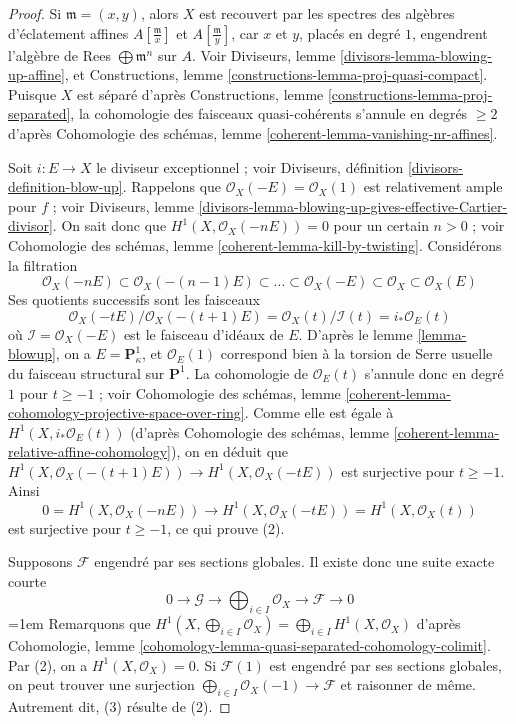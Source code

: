 \begin{proof} Si $\mathfrak m = (x, y)$, alors $X$ est recouvert par les spectres des algèbres d'éclatement affines $A[\frac{\mathfrak m}{x}]$ et $A[\frac{\mathfrak m}{y}]$, car $x$ et $y$, placés en degré $1$, engendrent l'algèbre de Rees $\bigoplus \mathfrak m^n$ sur $A$. Voir Diviseurs, lemme \ref{divisors-lemma-blowing-up-affine}, et Constructions, lemme \ref{constructions-lemma-proj-quasi-compact}. Puisque $X$ est séparé d'après Constructions, lemme \ref{constructions-lemma-proj-separated}, la cohomologie des faisceaux quasi-cohérents s'annule en degrés $\geq 2$ d'après Cohomologie des schémas, lemme \ref{coherent-lemma-vanishing-nr-affines}.

\medskip\noindent Soit $i : E \to X$ le diviseur exceptionnel ; voir Diviseurs, définition \ref{divisors-definition-blow-up}. Rappelons que $\mathcal{O}_X(-E) = \mathcal{O}_X(1)$ est relativement ample pour $f$ ; voir Diviseurs, lemme \ref{divisors-lemma-blowing-up-gives-effective-Cartier-divisor}. On sait donc que $H^1(X, \mathcal{O}_X(-nE)) = 0$ pour un certain $n > 0$ ; voir Cohomologie des schémas, lemme \ref{coherent-lemma-kill-by-twisting}. Considérons la filtration $$
\mathcal{O}_X(-nE) \subset \mathcal{O}_X(-(n - 1)E) \subset
\ldots \subset \mathcal{O}_X(-E) \subset \mathcal{O}_X \subset \mathcal{O}_X(E)
$$ Ses quotients successifs sont les faisceaux $$
\mathcal{O}_X(-t E)/\mathcal{O}_X(-(t + 1)E) =
\mathcal{O}_X(t)/\mathcal{I}(t) =
i_*\mathcal{O}_E(t)
$$ où $\mathcal{I} = \mathcal{O}_X(-E)$ est le faisceau d'idéaux de $E$. D'après le lemme \ref{lemma-blowup}, on a $E = \mathbf{P}^1_\kappa$, et $\mathcal{O}_E(1)$ correspond bien à la torsion de Serre usuelle du faisceau structural sur $\mathbf{P}^1$. La cohomologie de $\mathcal{O}_E(t)$ s'annule donc en degré $1$ pour $t \geq -1$ ; voir Cohomologie des schémas, lemme \ref{coherent-lemma-cohomology-projective-space-over-ring}. Comme elle est égale à $H^1(X, i_*\mathcal{O}_E(t))$ (d'après Cohomologie des schémas, lemme \ref{coherent-lemma-relative-affine-cohomology}), on en déduit que $H^1(X, \mathcal{O}_X(-(t + 1)E)) \to H^1(X, \mathcal{O}_X(-tE))$ est surjective pour $t \geq -1$. Ainsi $$
0 = H^1(X, \mathcal{O}_X(-nE))
\longrightarrow
H^1(X, \mathcal{O}_X(-tE)) = H^1(X, \mathcal{O}_X(t))
$$ est surjective pour $t \geq -1$, ce qui prouve (2).

\medskip\noindent Supposons $\mathcal{F}$ engendré par ses sections globales. Il existe donc une suite exacte courte $$
0 \to \mathcal{G} \to \bigoplus\nolimits_{i \in I} \mathcal{O}_X
\to \mathcal{F} \to 0
$$
\begingroup\emergencystretch=1em
Remarquons que $H^1(X, \bigoplus_{i \in I} \mathcal{O}_X) =
\bigoplus_{i \in I} H^1(X, \mathcal{O}_X)$ d'après Cohomologie, lemme \ref{cohomology-lemma-quasi-separated-cohomology-colimit}. Par (2), on a $H^1(X, \mathcal{O}_X) = 0$. Si $\mathcal{F}(1)$ est engendré par ses sections globales, on peut trouver une surjection $\bigoplus_{i \in I} \mathcal{O}_X(-1) \to \mathcal{F}$ et raisonner de même. Autrement dit, (3) résulte de (2).
\par\endgroup


\end{proof}
